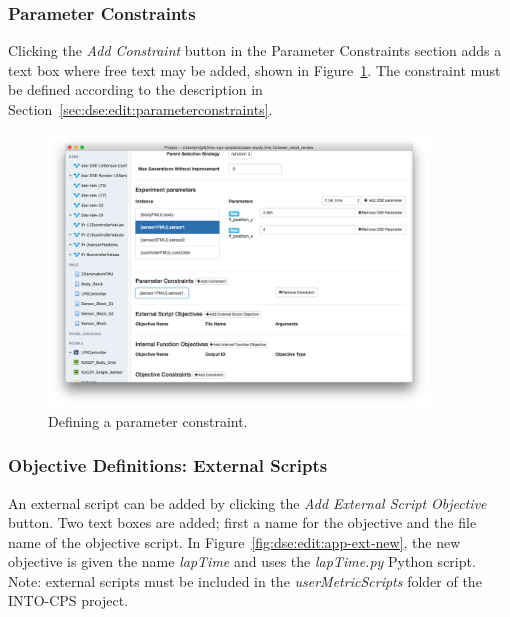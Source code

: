 \subsubsection{Parameter Constraints}\label{sec:dse:app:parameterconstraints}

Clicking the \textit{Add Constraint} button in the Parameter Constraints section adds a text box where free text may be added, shown in Figure~\ref{fig:dse:edit:app-param-const}. The constraint must be defined according to the description in Section~\ref{sec:dse:edit:parameterconstraints}.

\begin{figure}[ht]
	\centering
	\includegraphics[width=0.9\textwidth]{figures/dse/app-param-const}
	\caption{Defining a parameter constraint.}\label{fig:dse:edit:app-param-const}
\end{figure}
%
%
%

\subsubsection{Objective Definitions: External Scripts}\label{sec:dse:app:objectivesexternal}

An external script can be added by clicking the \textit{Add External Script Objective} button. Two text boxes are added; first a name for the objective and the file name of the objective script. In Figure~\ref{fig:dse:edit:app-ext-new}, the new objective is given the name \textit{lapTime} and uses the \textit{lapTime.py} Python script. Note: external scripts must be included in the \textit{userMetricScripts} folder of the INTO-CPS project.

